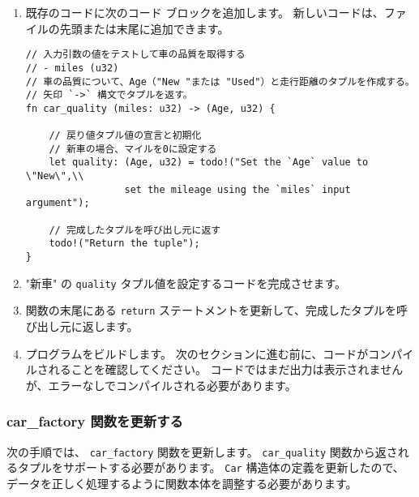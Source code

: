 \begin{enumerate}

\item 既存のコードに次のコード ブロックを追加します。 新しいコードは、ファイルの先頭または末尾に追加できます。

\begin{lstlisting}[numbers=none]
// 入力引数の値をテストして車の品質を取得する
// - miles (u32)
// 車の品質について、Age（"New "または "Used"）と走行距離のタプルを作成する。
// 矢印 `->` 構文でタプルを返す。
fn car_quality (miles: u32) -> (Age, u32) {

    // 戻り値タプル値の宣言と初期化
    // 新車の場合、マイルを0に設定する
    let quality: (Age, u32) = todo!("Set the `Age` value to \"New\",\\
                 set the mileage using the `miles` input argument");

    // 完成したタプルを呼び出し元に返す
    todo!("Return the tuple");
}
\end{lstlisting}

\item "新車" の \texttt{quality} タプル値を設定するコードを完成させます。

\item 関数の末尾にある \texttt{return} ステートメントを更新して、完成したタプルを呼び出し元に返します。

\item プログラムをビルドします。 次のセクションに進む前に、コードがコンパイルされることを確認してください。 コードではまだ出力は表示されませんが、エラーなしでコンパイルされる必要があります。


\end{enumerate}


\subsubsection{car\_factory 関数を更新する}

次の手順では、 \texttt{car\_factory} 関数を更新します。 \texttt{car\_quality} 関数から返されるタプルをサポートする必要があります。 \texttt{Car} 構造体の定義を更新したので、データを正しく処理するように関数本体を調整する必要があります。

